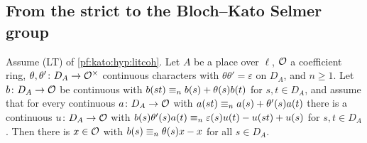 \subsection{From the strict to the Bloch--Kato Selmer group}\label{pf:kato:sec:upgrade}

\begin{lemma}\label{pf:kato:ltd}
Assume (LT) of \cref{pf:kato:hyp:litcoh}. Let $A$ be a place over $\ell$, $\mathcal{O}$ a coefficient ring, $\theta,\theta'\colon
D_A\to\mathcal{O}^\times$ continuous characters with $\theta\theta'=\varepsilon$ on $D_A$, and $n\ge1$. Let $b\colon D_A\to\mathcal{O}$ be continuous
with $b(st)\equiv_{n}b(s)+\theta(s)b(t)$ for $s,t\in D_A$, and assume that for every continuous $a\colon D_A\to\mathcal{O}$ with
$a(st)\equiv_{n}a(s)+\theta'(s)a(t)$ there is a continuous $u\colon D_A\to\mathcal{O}$ with
$b(s)\theta'(s)a(t)\equiv_{n}\varepsilon(s)u(t)-u(st)+u(s)$ for $s,t\in D_A$. Then there is $x\in\mathcal{O}$ with $b(s)\equiv_{n}\theta(s)x-x$
for all $s\in D_A$.
\end{lemma}

